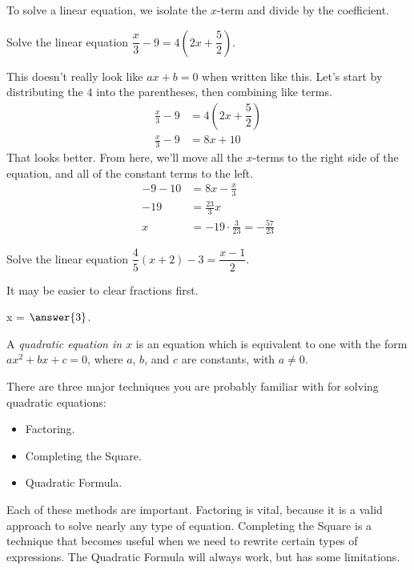 \documentclass{ximera}
\begin{document}
To solve a linear equation, we isolate the $x$-term and divide by the coefficient.
\begin{example}
	Solve the linear equation $\displaystyle \dfrac{x}{3} - 9 = 4\left( 2x + \dfrac{5}{2} \right)$.

	\begin{explanation}
		This doesn't really look like $ax + b = 0$ when written like this.  Let's start by distributing the $4$ into 
		the parentheses, then combining like terms.
		\begin{align*}
			\frac{x}{3} - 9 &= 4\left( 2x + \dfrac{5}{2} \right) \\
			\frac{x}{3} - 9 &= 8x + 10
		\end{align*}
		That looks better.  From here, we'll move all the $x$-terms to the right side of the equation, and all of
		the constant terms to the left.
		\begin{align*}
			- 9 - 10 &= 8x - \frac{x}{3}\\
			-19 &= \frac{23}{3} x \\
			x &= -19 \cdot \frac{3}{23} = -\frac{57}{23}
		\end{align*}
	\end{explanation}	
\end{example}


\begin{problem}
 	Solve the linear equation $\displaystyle \dfrac{4}{5}\left(x+2\right) - 3 = \dfrac{x-1}{2}$. 
 	\begin{hint}
    		It may be easier to clear fractions first.
	\end{hint}
  	\begin{prompt}
    		x = $\answer{3}$.
  	\end{prompt}
\end{problem}


A \emph{quadratic equation in $x$} is an equation which is equivalent to one with the form
	$ax^2 + bx + c = 0$, where $a$, $b$, and $c$ are constants, with $a \neq 0$.

There are three major techniques you are probably familiar with for solving quadratic equations:
\begin{itemize}
	\item Factoring.
	\item Completing the Square.
	\item Quadratic Formula.
\end{itemize}

Each of these methods are important.  Factoring is vital, because it is a valid approach to solve nearly any type of equation.  Completing
the Square is a technique that becomes useful when we need to rewrite certain types of expressions.  The Quadratic Formula will always
work, but has some limitations.
\end{document}
